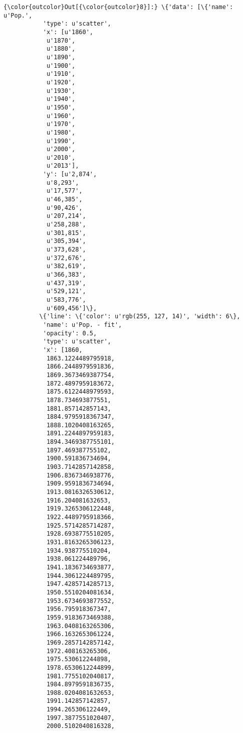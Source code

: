 \documentclass{article}
\begin{document}
            \begin{Verbatim}[commandchars=\\\{\}]
{\color{outcolor}Out[{\color{outcolor}8}]:} \{'data': [\{'name': u'Pop.',
           'type': u'scatter',
           'x': [u'1860',
            u'1870',
            u'1880',
            u'1890',
            u'1900',
            u'1910',
            u'1920',
            u'1930',
            u'1940',
            u'1950',
            u'1960',
            u'1970',
            u'1980',
            u'1990',
            u'2000',
            u'2010',
            u'2013'],
           'y': [u'2,874',
            u'8,293',
            u'17,577',
            u'46,385',
            u'90,426',
            u'207,214',
            u'258,288',
            u'301,815',
            u'305,394',
            u'373,628',
            u'372,676',
            u'382,619',
            u'366,383',
            u'437,319',
            u'529,121',
            u'583,776',
            u'609,456']\},
          \{'line': \{'color': u'rgb(255, 127, 14)', 'width': 6\},
           'name': u'Pop. - fit',
           'opacity': 0.5,
           'type': u'scatter',
           'x': [1860,
            1863.1224489795918,
            1866.2448979591836,
            1869.3673469387754,
            1872.4897959183672,
            1875.6122448979593,
            1878.734693877551,
            1881.857142857143,
            1884.9795918367347,
            1888.1020408163265,
            1891.2244897959183,
            1894.3469387755101,
            1897.469387755102,
            1900.591836734694,
            1903.7142857142858,
            1906.8367346938776,
            1909.9591836734694,
            1913.0816326530612,
            1916.204081632653,
            1919.3265306122448,
            1922.4489795918366,
            1925.5714285714287,
            1928.6938775510205,
            1931.8163265306123,
            1934.938775510204,
            1938.061224489796,
            1941.1836734693877,
            1944.3061224489795,
            1947.4285714285713,
            1950.5510204081634,
            1953.6734693877552,
            1956.795918367347,
            1959.9183673469388,
            1963.0408163265306,
            1966.1632653061224,
            1969.2857142857142,
            1972.408163265306,
            1975.530612244898,
            1978.6530612244899,
            1981.7755102040817,
            1984.8979591836735,
            1988.0204081632653,
            1991.142857142857,
            1994.265306122449,
            1997.3877551020407,
            2000.5102040816328,

\end{Verbatim}
\end{document}
